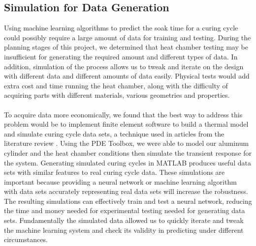 \subsection{Simulation for Data Generation}
Using machine learning algorithms to predict the soak time for a curing cycle could possibly require a large amount of data for training and testing. During the planning stages of this project, we determined that heat chamber testing may be insufficient for generating the required amount and different types of data. In addition, simulation of the process allows us to tweak and iterate on the design with different data and different amounts of data easily. Physical tests would add extra cost and time running the heat chamber, along with the difficulty of acquiring parts with different materials, various geometries and properties. \\\\
To acquire data more economically, we found that the best way to address this problem would be to implement finite element software to build a thermal model and simulate curing cycle data sets, a technique used in articles from the literature review \cite{rnn}. %
Using the PDE Toolbox, we were able to model our aluminum cylinder and the heat chamber conditions then simulate the transient response for the system. Generating simulated curing cycles in MATLAB produces useful data sets with similar features to real curing cycle data. These simulations are important because providing a neural network or machine learning algorithm with data sets accurately representing real data sets will increase the robustness. The resulting simulations can effectively train and test a neural network, reducing the time and money needed for experimental testing needed for generating data sets. Fundamentally the simulated data allowed us to quickly iterate and tweak the machine learning system and check its validity in predicting under different circumstances.  %

